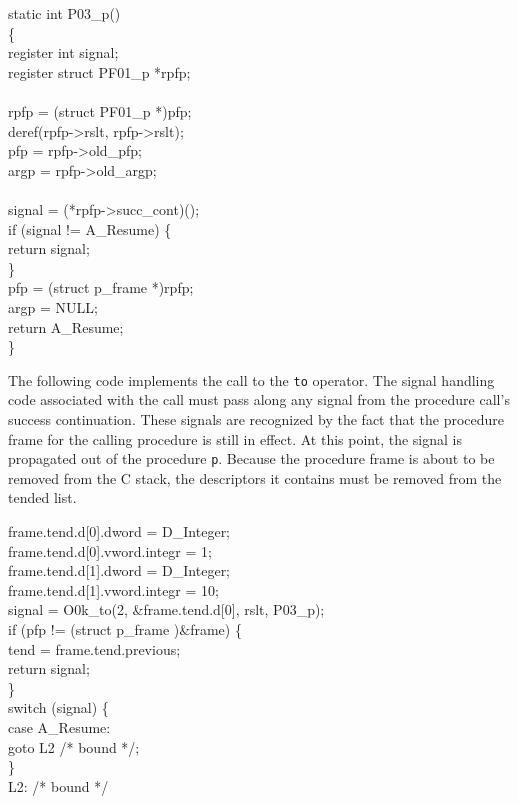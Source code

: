 \goodbreak
\begin{iconcode}
static int P03\_p()\\
\{\\
\>register int signal;\\
\>register struct PF01\_p *rpfp;\\
\\
\>rpfp = (struct PF01\_p *)pfp;\\
\>deref(rpfp->rslt, rpfp->rslt);\\
\>pfp = rpfp->old\_pfp;\\
\>argp = rpfp->old\_argp;\\
\\
\>signal = (*rpfp->succ\_cont)();\\
\>if (signal != A\_Resume) \{\\
\>\>return signal;\\
\>\>\}\\
\>pfp = (struct p\_frame *)rpfp;\\
\>argp = NULL;\\
\>return A\_Resume;\\
\}\\
\end{iconcode}


The following code implements the call to the \texttt{to}
operator. The signal handling code associated with the call must pass
along any signal from the procedure call's success continuation. These
signals are recognized by the fact that the procedure frame for the
calling procedure is still in effect. At this point, the signal is
propagated out of the procedure \texttt{p}. Because the procedure
frame is about to be removed from the C stack, the descriptors it
contains must be removed from the tended list.

\goodbreak
\begin{iconcode}
frame.tend.d[0].dword = D\_Integer;\\
frame.tend.d[0].vword.integr = 1;\\
frame.tend.d[1].dword = D\_Integer;\\
frame.tend.d[1].vword.integr = 10;\\
signal = O0k\_to(2, \&frame.tend.d[0], rslt, P03\_p);\\
if (pfp != (struct p\_frame )\&frame) \{\\
\>tend = frame.tend.previous;\\
\>return signal;\\
\>\}\\
switch (signal) \{\\
\>case A\_Resume:\\
\>\>goto L2 /* bound */;\\
\>\}\\
L2: /* bound */\\
\end{iconcode}



